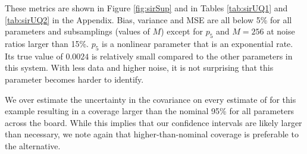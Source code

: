  These metrics are shown in Figure \ref{fig:sirSup} and in Tables \ref{tab:sirUQ1} and \ref{tab:sirUQ2} in the Appendix. Bias, variance and MSE are all below 5\% for all parameters and subsamplings (values of $M$) except for $p_5$ and $M=256$ at noise ratios larger than 15\%. $p_5$ is a nonlinear parameter that is an exponential rate. Its true value of $0.0024$ is relatively small compared to the other parameters in this system. With less data and higher noise, it is not surprising that this parameter becomes harder to identify.

We over estimate the uncertainty in the covariance on every estimate of for this example resulting in a coverage larger than the nominal 95\% for all parameters across the board. While this implies that our confidence intervals are likely larger than necessary, we note again that higher-than-nominal coverage is preferable to the alternative.
